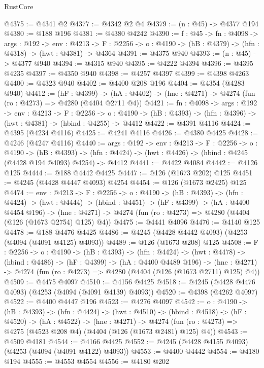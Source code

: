 \begin{lexlean}{RustCore}
\begin{coremodule}
@4375 := @4341 @2
@4377 := @4342 @2 @4
@4379 := (n : @45) -> @4377 @194
@4380 := @188 @196
@4381 := @4380 @4242
@4390 := {f : @45} ->
  {fn : @4098} ->
  {args : @192} ->
  {env : @4213} ->
  {F : @2256} -> {o : @4190} -> (hB : @4379) -> (hfn : @4318) -> (hwt : @4381) -> @4364
@4391 := @4375 @940
@4393 := (n : @45) -> @4377 @940
@4394 := @4315 @940
@4395 := @4222 @4394
@4396 := @4395 @4235
@4397 := @4350 @940
@4398 := @4257 @4397
@4399 := @4398 @4263
@4400 := @4323 @940
@4402 := @4400 @208 @196
@4404 := @4354 (@4283 @940)
@4412 := (hF : @4399) ->
  (hA : @4402) -> (hne : @4271) -> @4274 (fun (ro : @4273) => @4280 (@4404 @2711 @4))
@4421 := {fn : @4098} ->
  {args : @192} ->
  {env : @4213} ->
  {F : @2256} ->
  {o : @4190} -> (hB : @4393) -> (hfn : @4396) -> (hwt : @4381) -> (hbind : @4255) -> @4412
@4422 := @4391 @4116
@4424 := @4395 (@4234 @4116)
@4425 := @4241 @4116
@4426 := @4380 @4425
@4428 := @4246 (@4247 @4116)
@4440 := {args : @192} ->
  {env : @4213} ->
  {F : @2256} ->
  {o : @4190} ->
  (hB : @4393) ->
  (hfn : @4424) -> (hwt : @4426) -> (hbind : @4245 (@4428 @194 @4093) @4254) -> @4412
@4441 := @4422 @4084
@4442 := @4126 @125
@4444 := @188 @4442 @4425
@4447 := @126 (@1673 @202) @125
@4451 := @4245 (@4428 @4447 @4093) @4254
@4454 := @126 (@1673 @2425) @125
@4474 := {env : @4213} ->
  {F : @2256} ->
  {o : @4190} ->
  (hB : @4393) ->
  (hfn : @4424) ->
  (hwt : @4444) ->
  (hbind : @4451) ->
  (hF : @4399) ->
  (hA : @4400 @4454 @196) ->
  (hne : @4271) -> @4274 (fun (ro : @4273) => @4280 (@4404 (@126 (@1673 @2754) @125) @4))
@4475 := @4441 @4096
@4476 := @4140 @125
@4478 := @188 @4476 @4425
@4486 := @4245 (@4428 @4442 @4093) (@4253 (@4094 (@4091 @4125) @4093))
@4489 := @126 (@1673 @208) @125
@4508 := {F : @2256} ->
  {o : @4190} ->
  (hB : @4393) ->
  (hfn : @4424) ->
  (hwt : @4478) ->
  (hbind : @4486) ->
  (hF : @4399) ->
  (hA : @4400 @4489 @196) ->
  (hne : @4271) -> @4274 (fun (ro : @4273) => @4280 (@4404 (@126 (@1673 @2711) @125) @4))
@4509 := @4475 @4097
@4510 := @4156 @4425
@4518 := @4245 (@4428 @4476 @4093) (@4253 (@4094 (@4091 @4139) @4093))
@4520 := @4398 (@4262 @4097)
@4522 := @4400 @4447 @196
@4523 := @4276 @4097
@4542 := {o : @4190} ->
  (hB : @4393) ->
  (hfn : @4424) ->
  (hwt : @4510) ->
  (hbind : @4518) ->
  (hF : @4520) ->
  (hA : @4522) ->
  (hne : @4271) ->
  @4274 (fun (ro : @4273) => @4275 (@4523 @208 @4) (@4404 (@126 (@1673 @2481) @125) @4))
@4543 := @4509 @4181
@4544 := @4166 @4425
@4552 := @4245 (@4428 @4155 @4093) (@4253 (@4094 (@4091 @4122) @4093))
@4553 := @4400 @4442
@4554 := @4180 @194
@4555 := @4553 @4554
@4556 := @4180 @202

\end{coremodule}
\end{lexlean}
